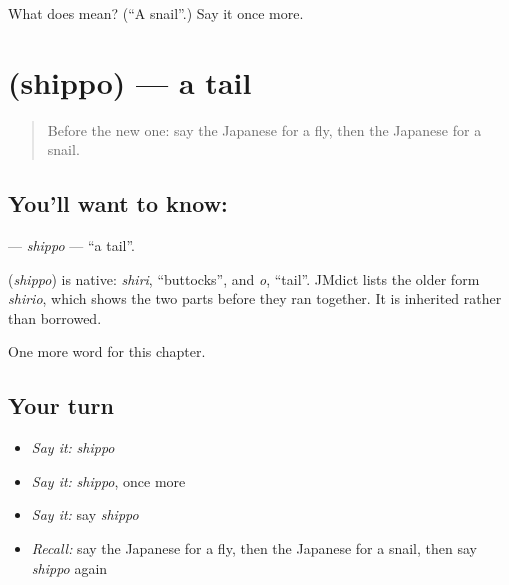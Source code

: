 \begin{tcolorbox}[breakable,colback=teal!4,colframe=teal!35!black,title={Before you move on}]
What does  mean? (\textquotedblleft{}A snail\textquotedblright{}.) Say it once more.
\end{tcolorbox}
\section[\texorpdfstring{\ja{しっぽ} (shippo)}{しっぽ (shippo)}]{ (shippo) — a tail}

\label{lesson:JA-C110-shippo}



\begin{quote}
Before the new one: say the Japanese for a fly, then the Japanese for a snail.
\end{quote}

\subsection*{You'll want to know: }
\textbf{} — \emph{shippo} — \textquotedblleft{}a tail\textquotedblright{}.

\begin{cousinweb}
\textbf{} (\emph{shippo}) is native: \emph{shiri}, \textquotedblleft{}buttocks\textquotedblright{}, and \emph{o}, \textquotedblleft{}tail\textquotedblright{}. JMdict lists the older form \emph{shirio}, which shows the two parts before they ran together. It is inherited rather than borrowed.
\end{cousinweb}

\begin{grammarlens}[title={What you've built}]
One more word for this chapter.
\end{grammarlens}

\subsection*{Your turn}
\begin{itemize}
\raggedright
  \item \emph{Say it:} \emph{shippo}
  \item \emph{Say it:} \emph{shippo}, once more
  \item \emph{Say it:} say \emph{shippo}
  \item \emph{Recall:} say the Japanese for a fly, then the Japanese for a snail, then say \emph{shippo} again
\end{itemize}

